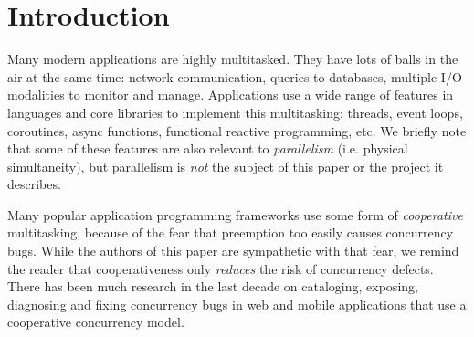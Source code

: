 \documentclass[acmsmall,anonymous,review]{acmart}\settopmatter{printfolios=true,printccs=false,printacmref=false}
\begin{document}

\maketitle




\section{Introduction}

Many modern applications are highly multitasked.
They have lots of balls in the air at the same time: network communication, queries to databases, multiple I/O modalities to monitor and manage.
Applications use a wide range of features in languages and core libraries to implement this multitasking: threads, event loops, coroutines, async functions, functional reactive programming, etc.
We briefly note that some of these features are also relevant to \emph{parallelism} (i.e. physical simultaneity), but parallelism is \emph{not} the subject of this paper or the project it describes.

Many popular application programming frameworks use some form of \emph{cooperative} multitasking, because of the fear that preemption too easily causes concurrency bugs.
While the authors of this paper are sympathetic with that fear, we remind the reader that cooperativeness only \emph{reduces} the risk of concurrency defects\footnotemark{}.
There has been much research in the last decade on cataloging, exposing, diagnosing and fixing concurrency bugs in web and mobile applications that use a cooperative concurrency model.
\end{document}
